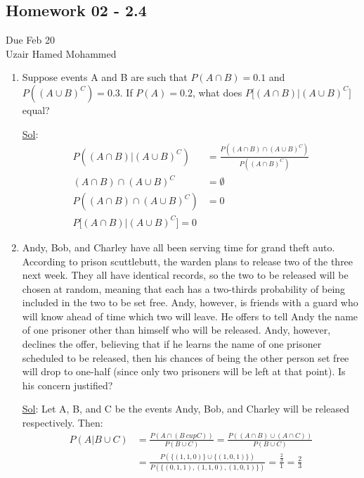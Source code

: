 \begin{center}
  \section*{Homework 02 - 2.4}
  Due Feb 20 \\
  Uzair Hamed Mohammed
\end{center}


\begin{enumerate}
  \item[10.] Suppose events A and B are such that $P(A \cap B) = 0.1$
    and $P((A \cup B)^C) = 0.3$. If $P(A) = 0.2$, what does $P
    \lbrack (A \cap B) | (A \cup B)^C \rbrack$ equal?

    \underline{Sol}: \[
      \begin{aligned}
        P((A \cap B) | (A \cup B)^C) &= \frac{P((A \cap B) \cap (A
        \cup B)^C)}{P((A \cap B)^C)} \\
        (A \cap B) \cap (A \cup B)^C &= \emptyset \\
        P((A \cap B) \cap (A \cup B)^C) &= 0 \\
        \boxed{P \lbrack (A \cap B) | (A \cup B)^C \rbrack = 0}
      \end{aligned}
    \]

  \item[20.] Andy, Bob, and Charley have all been serving time for
    grand theft auto. According to prison scuttlebutt, the warden
    plans to release two of the three next week. They all have
    identical records, so the two to be released will be chosen at
    random, meaning that each has a two-thirds probability of being
    included in the two to be set free. Andy, however, is friends
    with a guard who will know ahead of time which two will leave. He
    offers to tell Andy the name of one prisoner other than himself
    who will be released. Andy, however, declines the offer,
    believing that if he learns the name of one prisoner scheduled to
    be released, then his chances of being the other person set free
    will drop to one-half (since only two prisoners will be left at
    that point). Is his concern justified?

    \underline{Sol}:
    Let A, B, and C be the events Andy, Bob, and Charley will be
    released respectively. Then:
    \[
      \begin{aligned}
        P(A | B \cup C) &= \frac{P(A \cap (B \ cup C))}{P(B \cup C)}
        = \frac{P((A \cap B) \cup (A \cap C))}{P(B \cup C)} \\
        &= \frac{P(\lbrace (1, 1, 0) \rbrace \cup \lbrace (1, 0, 1)
        \rbrace)}{P(\lbrace (0, 1, 1), (1, 1, 0), (1, 0, 1) \rbrace)}
        = \frac{\frac{2}{3}}{1} = \boxed{\frac{2}{3}}
      \end{aligned}
    \]


\end{enumerate}
